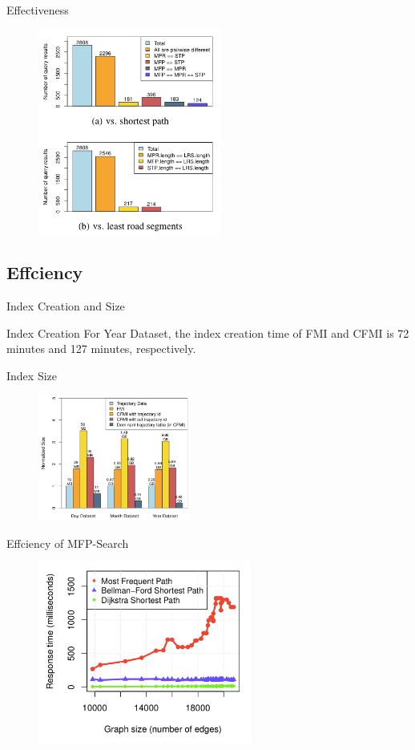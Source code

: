 \documentclass[mathserif]{beamer}
\begin{document}
\begin{frame}{Effectiveness}
\begin{figure}
\includegraphics[width = 6cm]{exp2.png}
\end{figure}
\end{frame}

\subsection{Effciency}

\begin{frame}{Index Creation and Size}
\begin{block}{Index Creation}
For Year Dataset, the index creation time of FMI and CFMI is 72 minutes and 127 minutes, respectively.\\
\end{block}

\begin{block}{Index Size}
\begin{figure}
\includegraphics[width = 5cm]{exp3.png}
\end{figure}
\end{block}
\end{frame}

\begin{frame}{Effciency of MFP-Search}
\begin{figure}
\includegraphics[width = 7cm]{exp4.png}
\end{figure}
\end{frame}
\end{document}
